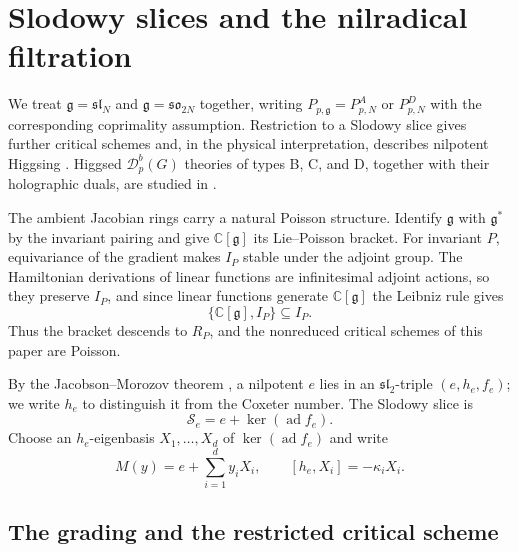 \documentclass[10pt,reqno]{amsart}
\numberwithin{equation}{section}
\theoremstyle{plain}
\theoremstyle{definition}
\DeclareMathOperator{\ad}{ad}
\begin{document}
\section{Slodowy slices and the nilradical filtration}\label{sec:slices}

We treat $\mathfrak{g}=\mathfrak{sl}_N$ and $\mathfrak{g}=\mathfrak{so}_{2N}$ together, writing $P_{p,\mathfrak{g}}=P^A_{p,N}$ or $P^D_{p,N}$ with the corresponding coprimality assumption. Restriction to a Slodowy slice gives further critical schemes and, in the physical interpretation, describes nilpotent Higgsing \cite{Chacaltana:2012zy,Beem:2014rza}. Higgsed $\mathcal{D}_p^b(G)$ theories of types B, C, and D, together with their holographic duals, are studied in \cite{Couzens:2023kyf}.

The ambient Jacobian rings carry a natural Poisson structure. Identify $\mathfrak{g}$ with $\mathfrak{g}^*$ by the invariant pairing and give $\mathbb{C}[\mathfrak{g}]$ its Lie--Poisson bracket. For invariant $P$, equivariance of the gradient makes $I_P$ stable under the adjoint group. The Hamiltonian derivations of linear functions are infinitesimal adjoint actions, so they preserve $I_P$, and since linear functions generate $\mathbb{C}[\mathfrak{g}]$ the Leibniz rule gives
\begin{equation}\label{eq:poisson}
	\{\mathbb{C}[\mathfrak{g}],I_P\}\subseteq I_P .
\end{equation}
Thus the bracket descends to $R_P$, and the nonreduced critical schemes of this paper are Poisson.

By the Jacobson--Morozov theorem \cite{CM}, a nilpotent $e$ lies in an $\mathfrak{sl}_2$-triple $(e,h_e,f_e)$; we write $h_e$ to distinguish it from the Coxeter number. The Slodowy slice \cite{Slodowy} is
\begin{equation*}
	\mathcal{S}_e=e+\ker(\ad f_e).
\end{equation*}
Choose an $h_e$-eigenbasis $X_1,\dots,X_d$ of $\ker(\ad f_e)$ and write
\begin{equation*}
	M(y)=e+\sum_{i=1}^dy_iX_i,\qquad [h_e,X_i]=-\kappa_iX_i .
\end{equation*}

\subsection{The grading and the restricted critical scheme}
\end{document}
